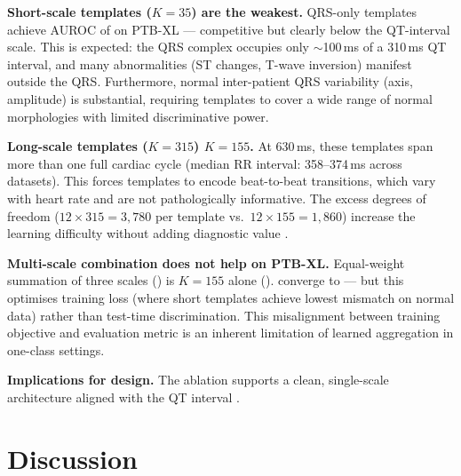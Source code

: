 \documentclass{iopjournal}
\begin{document}
\textbf{Short-scale templates ($K=35$) are the weakest.} QRS-only templates achieve AUROC of  on PTB-XL --- competitive but clearly below the QT-interval scale. This is expected: the QRS complex occupies only $\sim$100\,ms of a 310\,ms QT interval, and many abnormalities (ST changes, T-wave inversion) manifest outside the QRS. Furthermore, normal inter-patient QRS variability (axis, amplitude) is substantial, requiring templates to cover a wide range of normal morphologies with limited discriminative power.

\textbf{Long-scale templates ($K=315$)  $K=155$.} At 630\,ms, these templates span more than one full cardiac cycle (median RR interval: 358--374\,ms across datasets). This forces templates to encode beat-to-beat transitions, which vary with heart rate and are not pathologically informative. The excess degrees of freedom ($12 \times 315 = 3{,}780$ per template vs.\ $12 \times 155 = 1{,}860$) increase the learning difficulty without adding diagnostic value .

\textbf{Multi-scale combination does not help on PTB-XL.} Equal-weight summation of three scales () is \emph{} $K=155$ alone ().  converge to  --- but this optimises training loss (where short templates achieve lowest mismatch on normal data) rather than test-time discrimination. This misalignment between training objective and evaluation metric is an inherent limitation of learned aggregation in one-class settings.

\textbf{Implications for design.} The ablation supports a clean, single-scale architecture aligned with the QT interval . 

\section{Discussion}
\end{document}
